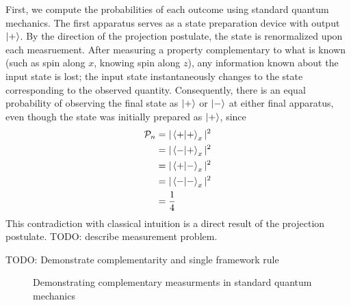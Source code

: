 First, we compute the probabilities of each outcome using standard quantum mechanics. The first apparatus serves as a state preparation device with output $\ket{+}$. By the direction of the projection postulate, the state is renormalized upon each measruement. After measuring a property complementary to what is known (such as spin along $x$, knowing spin along $z$), any information known about the input state is lost; the input state instantaneously changes to the state corresponding to the observed quantity. Consequently, there is an equal probability of observing the final state as $\ket{+}$ or $\ket{-}$ at either final apparatus, even though the state was initially prepared as $\ket{+}$, since
\begin{align*}
    \mathcal{P}_n &= |\braket{+|+}_x|^2 \\
                  &= |\braket{-|+}_x|^2 \\
                  &= |\braket{+|-}_x|^2 \\
                  &= |\braket{-|-}_x|^2 \\
                  &= \frac{1}{4}
\end{align*}
This contradiction with classical intuition is a direct result of the projection postulate. TODO: describe measurement problem.

TODO: Demonstrate complementarity and single framework rule

\begin{figure}
\centering\CaptionFontSize
{}
\caption[Insert an abbreviated caption here to show in the List of Figures]
{Demonstrating complementary measurments in standard quantum mechanics}
\label{Figure:Intro:FigureExampleC}
\end{figure}

